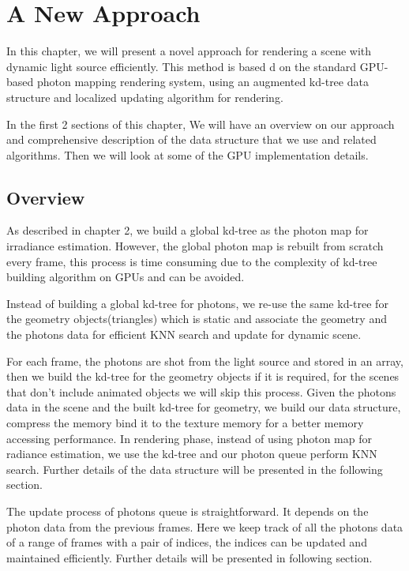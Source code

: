 \chapter{A New Approach}

In this chapter, we will present a novel approach for rendering a scene with dynamic light source efficiently. This method is based d on the standard GPU-based photon mapping rendering system, using an augmented kd-tree data structure and localized updating algorithm for rendering.

In the first 2 sections of this chapter, We will have an overview on our approach and comprehensive description of the data structure that we use and related algorithms. Then we will look at some of the GPU implementation details.

\section{Overview}

As described in chapter 2, we build a global kd-tree as the photon map for irradiance estimation. However, the global photon map is rebuilt from scratch every frame, this process is time consuming due to the complexity of kd-tree building algorithm on GPUs and can be avoided.

Instead of building a global kd-tree for photons, we re-use the same kd-tree for the geometry objects(triangles) which is static and associate the geometry and the photons data for efficient KNN search and update for dynamic scene.

For each frame, the photons are shot from the light source and stored in an array, then we build the kd-tree for the geometry objects if it is required, for the scenes that don't include animated objects we will skip this process. Given the photons data in the scene and the built kd-tree for geometry, we build our data structure, compress the memory bind it to the texture memory for a better memory accessing performance. In rendering phase, instead of using photon map for radiance estimation, we use the kd-tree and our photon queue perform KNN search. Further details of the data structure will be presented in the following section.

The update process of photons queue is straightforward. It depends on the photon data from the previous frames. Here we keep track of all the photons data of a range of frames with a pair of indices, the indices can be updated and maintained efficiently. Further details will be presented in following section.

